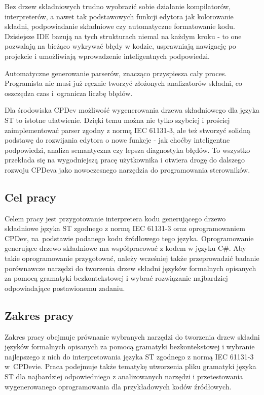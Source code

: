 \documentclass[12pt,twoside]{article}
\begin{document}
Bez drzew składniowych trudno wyobrazić sobie działanie kompilatorów, interpreterów, a nawet tak podstawowych funkcji edytora jak kolorowanie składni, podpowiadanie składniowe czy automatyczne formatowanie kodu. Dzisiejsze IDE bazują na tych strukturach niemal na każdym kroku - to one pozwalają na bieżąco wykrywać błędy w kodzie, usprawniają nawigację po projekcie i umożliwiają wprowadzenie inteligentnych podpowiedzi.

Automatyczne generowanie parserów, znacząco przyspiesza cały proces. Programista nie musi już ręcznie tworzyć złożonych analizatorów składni, co oszczędza czas i~ogranicza liczbę błędów.

Dla środowiska CPDev możliwość wygenerowania drzewa składniowego dla języka ST to istotne ułatwienie. Dzięki temu można nie tylko szybciej i prościej zaimplementować parser zgodny z normą IEC 61131-3, ale też stworzyć solidną podstawę do rozwijania edytora o nowe funkcje - jak choćby inteligentne podpowiedzi, analiza semantyczna czy lepsza diagnostyka błędów. To wszystko przekłada się na wygodniejszą pracę użytkownika i otwiera drogę do dalszego rozwoju CPDeva jako nowoczesnego narzędzia do programowania sterowników.


\subsection{Cel pracy}
Celem pracy jest przygotowanie interpretera kodu generującego drzewo składniowe języka ST zgodnego z normą IEC 61131-3 oraz oprogramowaniem CPDev, na~podstawie podanego kodu źródłowego tego języka. Oprogramowanie generujące drzewo składniowe ma współpracować z kodem w języku C\#. Aby takie oprogramowanie przygotować, należy wcześniej także przeprowadzić badanie porównawcze narzędzi do tworzenia drzew składni języków formalnych opisanych za pomocą gramatyki bezkontekstowej i wybrać rozwiązanie najbardziej odpowiadające postawionemu zadaniu.

\subsection{Zakres pracy}
Zakres pracy obejmuje prównanie wybranych narzędzi do tworzenia drzew skła\-dni języków formalnych opisanych za pomocą gramatyki bezkontekstowej i wybranie najlepszego z nich do interpretowania języka ST zgodnego z normą IEC 61131-3 w~CPDevie. Praca podejmuje także tematykę utworzenia pliku gramatyki języka ST dla najbardziej odpowiedniego z analizowanych narzędzi i przetestowania wygenerowanego oprogramowania dla przykładowych kodów źródłowych.
\end{document}

